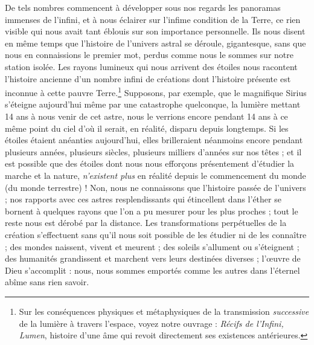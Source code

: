 \documentclass[a4paper, 11pt, oneside]{article}
\begin{document}
De tels nombres commencent à développer sous nos regards les panoramas immenses de l'infini, et à nous éclairer sur l'infime condition de la Terre, ce rien visible qui nous avait tant éblouis sur son importance personnelle. Ils nous disent en même temps que l'histoire de l'univers astral se déroule, gigantesque, sans que nous en connaissions le premier mot, perdus comme nous le sommes sur notre station isolée. Les rayons lumineux qui nous arrivent des étoiles nous racontent l'histoire ancienne d'un nombre infini de créations dont l'histoire présente est inconnue à cette pauvre Terre.\footnote{Sur les conséquences physiques et métaphysiques de la transmission \emph{successive} de la lumière à travers l'espace, voyez notre ouvrage : \emph{Récifs de l'Infini, Lumen}, histoire d'une âme qui revoit directement ses existences antérieures.} Supposons, par exemple, que le magnifique Sirius s'éteigne aujourd'hui même par une catastrophe quelconque, la lumière mettant 14 ans à nous venir de cet astre, nous le verrions encore pendant 14 ans à ce même point du ciel d'où il serait, en réalité, disparu depuis longtemps. Si les étoiles étaient anéanties aujourd'hui, elles brilleraient néanmoins encore pendant plusieurs années, plusieurs siècles, plusieurs milliers d'années sur nos têtes ; et il est possible que des étoiles dont nous nous efforçons présentement d'étudier la marche et la nature, \emph{n'existent plus} en réalité depuis le commencement du monde (du monde terrestre) ! Non, nous ne connaissons que l'histoire passée de l'univers ; nos rapports avec ces astres resplendissants qui étincellent dans l'éther se bornent à quelques rayons que l'on a pu mesurer pour les plus proches ; tout le reste nous est dérobé par la distance. Les transformations perpétuelles de la création s'effectuent sans qu'il nous soit possible de les étudier ni de les connaître ; des mondes naissent, vivent et meurent ; des soleils s'allument ou s'éteignent ; des humanités grandissent et marchent vers leurs destinées diverses ; l'œuvre de Dieu s'accomplit : nous, nous sommes emportés comme les autres dans l'éternel abîme sans rien savoir.
\end{document}
